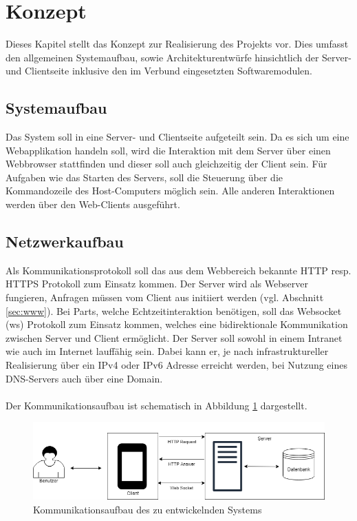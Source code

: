 \section{Konzept}\label{sec:konzept}
Dieses Kapitel stellt das Konzept zur Realisierung des Projekts vor. 
Dies umfasst den allgemeinen Systemaufbau, sowie Architekturentwürfe hinsichtlich der Server- und Clientseite inklusive den im Verbund eingesetzten Softwaremodulen.
\subsection{Systemaufbau}\label{sec:sysaufbau}
Das System soll in eine Server- und Clientseite aufgeteilt sein. 
Da es sich um eine Webapplikation handeln soll, wird die Interaktion mit dem Server über einen Webbrowser stattfinden und dieser soll auch gleichzeitig der Client sein. Für Aufgaben wie das Starten des Servers, soll die Steuerung über die Kommandozeile des Host-Computers möglich sein. Alle anderen Interaktionen werden über den Web-Clients ausgeführt.
\subsection{Netzwerkaufbau}\label{sec:netzwerkaufbau}
Als Kommunikationsprotokoll soll das aus dem Webbereich bekannte HTTP resp. HTTPS Protokoll zum Einsatz kommen. Der Server wird als Webserver fungieren, Anfragen müssen vom Client aus initiiert werden (vgl. Abschnitt \ref{sec:www}). Bei Parts, welche Echtzeitinteraktion benötigen, soll das Websocket (ws) Protokoll zum Einsatz kommen, welches eine bidirektionale Kommunikation zwischen Server und Client ermöglicht. Der Server soll sowohl in einem Intranet wie auch im Internet lauffähig sein. Dabei kann er, je nach infrastruktureller Realisierung über ein IPv4 oder IPv6 Adresse erreicht werden, bei Nutzung eines DNS-Servers auch über eine Domain.\\ \\

Der Kommunikationsaufbau ist schematisch in Abbildung \ref{fig:server_kommdiagram} dargestellt. 

\begin{figure}[H]
	\centering
	\includegraphics[width=0.8\linewidth]{bilder/server_diagram}
	\caption[Kommunikationsaufbau des zu entwickelnden Systems]{Kommunikationsaufbau des zu entwickelnden Systems}
	\label{fig:server_kommdiagram}
\end{figure}


